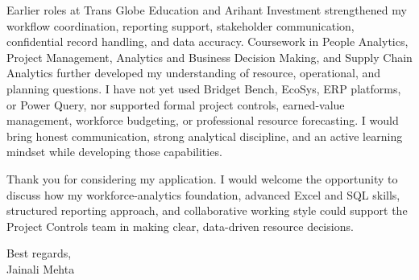 \documentclass[letterpaper,11pt]{article}
\begin{document}
\bigbreak
Earlier roles at Trans Globe Education and Arihant Investment strengthened my workflow coordination, reporting support, stakeholder communication, confidential record handling, and data accuracy. Coursework in People Analytics, Project Management, Analytics and Business Decision Making, and Supply Chain Analytics further developed my understanding of resource, operational, and planning questions. I have not yet used Bridget Bench, EcoSys, ERP platforms, or Power Query, nor supported formal project controls, earned-value management, workforce budgeting, or professional resource forecasting. I would bring honest communication, strong analytical discipline, and an active learning mindset while developing those capabilities.

\bigbreak
Thank you for considering my application. I would welcome the opportunity to discuss how my workforce-analytics foundation, advanced Excel and SQL skills, structured reporting approach, and collaborative working style could support the Project Controls team in making clear, data-driven resource decisions.

\bigbreak
Best regards,\\
Jainali Mehta
\end{document}

